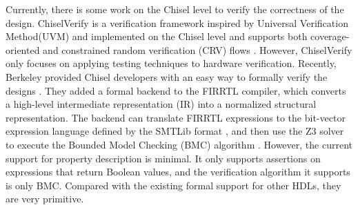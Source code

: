 \documentclass[conference]{IEEEtran}
\theoremstyle{definition}
\begin{document}
Currently, there is some work on the Chisel level to verify the correctness of the design. ChiselVerify is a verification framework inspired by Universal Verification Method(UVM) and implemented on the Chisel level and supports both coverage-oriented and constrained random verification (CRV) flows \cite{dobis2021chiselverify}. However, ChiselVerify only focuses on applying testing techniques to hardware verification.
Recently, Berkeley provided Chisel developers with an easy way to formally verify the designs \cite{dobis2021open}. They added a formal backend to the FIRRTL compiler, which converts a high-level intermediate representation (IR) into a normalized structural representation. The backend can translate FIRRTL expressions to the bit-vector expression language defined by the SMTLib format \cite{barrett2010smt}, and then use the Z3 solver \cite{moura2008z3} to execute the Bounded Model Checking (BMC) algorithm \cite{biere2009bounded}.
However, the current support for property description is minimal. It only supports assertions on expressions that return Boolean values, and the verification algorithm it supports is only BMC. Compared with the existing formal support for other HDLs, they are very primitive.
\end{document}
